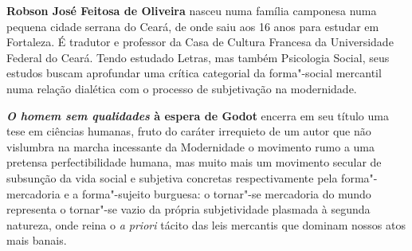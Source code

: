 
\textbf{Robson José Feitosa de Oliveira} nasceu numa família camponesa numa pequena cidade serrana do Ceará, de onde saiu aos 16 anos para estudar em Fortaleza. É tradutor e professor da Casa de Cultura Francesa da Universidade Federal do Ceará. Tendo estudado Letras, mas também Psicologia Social, seus estudos buscam aprofundar uma crítica categorial da forma"-social mercantil numa relação dialética com o processo de subjetivação na modernidade.


\textbf{\emph{O homem sem qualidades} à espera de Godot} encerra em seu título uma tese em ciências humanas, fruto do caráter irrequieto de um autor que não vislumbra na marcha incessante da Modernidade o movimento rumo a uma pretensa perfectibilidade humana, mas muito mais um movimento secular de subsunção da vida social e subjetiva concretas respectivamente pela forma"-mercadoria e a forma"-sujeito burguesa: o tornar"-se mercadoria do mundo representa o tornar"-se vazio da própria subjetividade plasmada à segunda natureza, onde reina o \emph{a priori} tácito das leis mercantis que dominam nossos atos mais banais.

